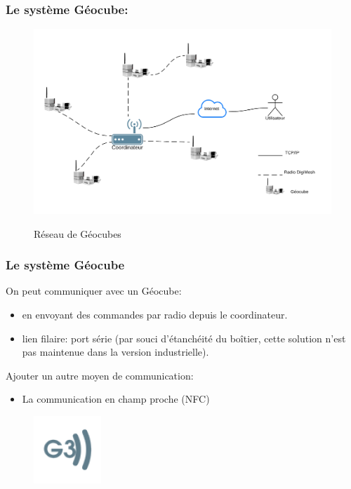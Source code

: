 \documentclass{beamer}
\begin{document}
\begin{frame}
\frametitle{Le système Géocube:}
\begin{figure}
\centering
\includegraphics[scale=0.53]{images/grid.png}
\label{fig:grid}
\caption{Réseau de Géocubes}
\end{figure}
\end{frame}

\begin{frame}
\frametitle{Le système Géocube}
On peut communiquer avec un Géocube:
\begin{itemize}
\item en envoyant des commandes par radio depuis le coordinateur.
\item lien filaire: port série (par souci d'étanchéité du boîtier, cette solution n'est pas maintenue dans la version industrielle).
\end{itemize}

Ajouter un autre moyen de communication:
\begin{itemize}
\item La communication en champ proche (NFC)
\end{itemize}
\begin{figure}
\centering
\includegraphics[scale=0.7]{images/g3nfc.png}
\end{figure}
\end{frame}

\end{document}
